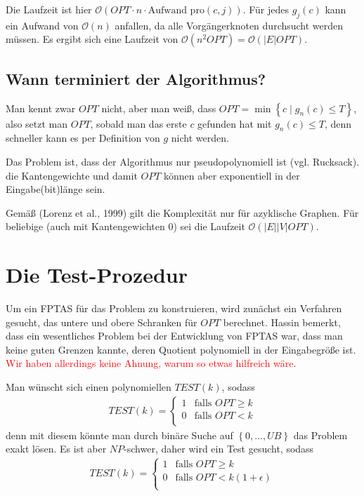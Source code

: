 \documentclass{article}
\begin{document}
Die Laufzeit ist hier $\mathcal{O}(OPT\cdot n \cdot \text{Aufwand pro
$(c,j)$})$. Für jedes $g_j(c)$ kann ein Aufwand von $\mathcal{O}\left(n\right)$ anfallen,
da alle Vorgängerknoten durchsucht werden müssen. Es ergibt sich eine Laufzeit
von $\mathcal{O}\left(n^2 OPT\right) = \mathcal{O}\left(|E| OPT\right)$.

\subsection{Wann terminiert der Algorithmus?}

Man kennt zwar $OPT$ nicht, aber man weiß, dass $OPT=\min\left\{c \mid g_n(c)
\le T\right\}$, also setzt man $OPT$, sobald man das erste $c$ gefunden hat mit 
$g_n(c)\le T$, denn schneller kann es per Definition von $g$ nicht werden.

Das Problem ist, dass der Algorithmus nur pseudopolynomiell ist (vgl. Rucksack).
die Kantengewichte und damit $OPT$ können aber exponentiell in der Eingabe(bit)länge sein.

Gemäß (Lorenz et al., 1999) gilt die Komplexität nur für azyklische Graphen. Für
beliebige (auch mit Kantengewichten $0$) sei die Laufzeit
$\mathcal{O}\left(|E||V|OPT\right)$.

\section{Die Test-Prozedur}

Um ein FPTAS für das Problem zu konstruieren, wird zunächst ein Verfahren
gesucht, das untere und obere Schranken für $OPT$ berechnet. Hassin bemerkt,
dass ein wesentliches Problem bei der Entwicklung von FPTAS war, dass man keine
guten Grenzen kannte, deren Quotient polynomiell in der Eingabegröße ist.
\textcolor{red}{Wir haben allerdings keine Ahnung, warum so etwas hilfreich wäre}.

Man wünscht sich einen polynomiellen $TEST(k)$, sodass 
\begin{align*}
   TEST(k) = 
   \begin{cases}
      1 & \text{falls } OPT \ge k \\
      0 & \text{falls } OPT < k \\
   \end{cases} 
\end{align*}
denn mit diesem könnte man durch binäre Suche auf $\left\{0,\ldots,UB\right\}$ das
Problem exakt lösen. Es ist aber $NP$-schwer, daher wird ein Test gesucht,
sodass
\begin{align*}
   TEST(k) = 
   \begin{cases}
      1 & \text{falls } OPT \ge k \\
      0 & \text{falls } OPT < k(1 + \epsilon) \\
   \end{cases} 
\end{align*}
\end{document}
